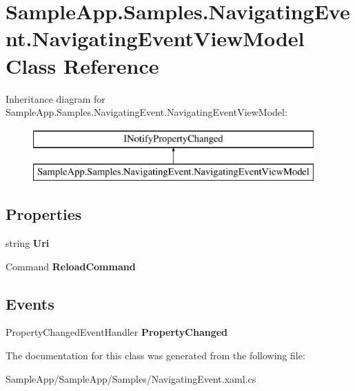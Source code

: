 \hypertarget{class_sample_app_1_1_samples_1_1_navigating_event_1_1_navigating_event_view_model}{}\section{Sample\+App.\+Samples.\+Navigating\+Event.\+Navigating\+Event\+View\+Model Class Reference}
\label{class_sample_app_1_1_samples_1_1_navigating_event_1_1_navigating_event_view_model}
Inheritance diagram for Sample\+App.\+Samples.\+Navigating\+Event.\+Navigating\+Event\+View\+Model\+:\begin{figure}[H]
\begin{center}
\leavevmode
\includegraphics[height=2.000000cm]{class_sample_app_1_1_samples_1_1_navigating_event_1_1_navigating_event_view_model}
\end{center}
\end{figure}
\subsection*{Properties}
\begin{DoxyCompactItemize}
\item 
\mbox{\label{class_sample_app_1_1_samples_1_1_navigating_event_1_1_navigating_event_view_model_a817d655035da27cc5a98cfa90abea787}} 
string {\bfseries Uri}
\item 
\mbox{\label{class_sample_app_1_1_samples_1_1_navigating_event_1_1_navigating_event_view_model_a47f7a9f6c9884325bd7d189124988cab}} 
Command {\bfseries Reload\+Command}
\end{DoxyCompactItemize}
\subsection*{Events}
\begin{DoxyCompactItemize}
\item 
\mbox{\label{class_sample_app_1_1_samples_1_1_navigating_event_1_1_navigating_event_view_model_a87db7e4f2a9317601a4393c597686700}} 
Property\+Changed\+Event\+Handler {\bfseries Property\+Changed}
\end{DoxyCompactItemize}


The documentation for this class was generated from the following file\+:\begin{DoxyCompactItemize}
\item 
Sample\+App/\+Sample\+App/\+Samples/Navigating\+Event.\+xaml.\+cs\end{DoxyCompactItemize}
